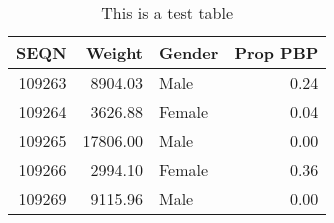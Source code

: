 \begin{table}[h]
\caption{This is a test table}
\label{test_table}
\begin{tabular}{rrlr}
\toprule
SEQN & Weight & Gender & Prop PBP \\
\midrule
109263 & 8904.03 & Male & 0.24 \\
109264 & 3626.88 & Female & 0.04 \\
109265 & 17806.00 & Male & 0.00 \\
109266 & 2994.10 & Female & 0.36 \\
109269 & 9115.96 & Male & 0.00 \\
\bottomrule
\end{tabular}
\end{table}
